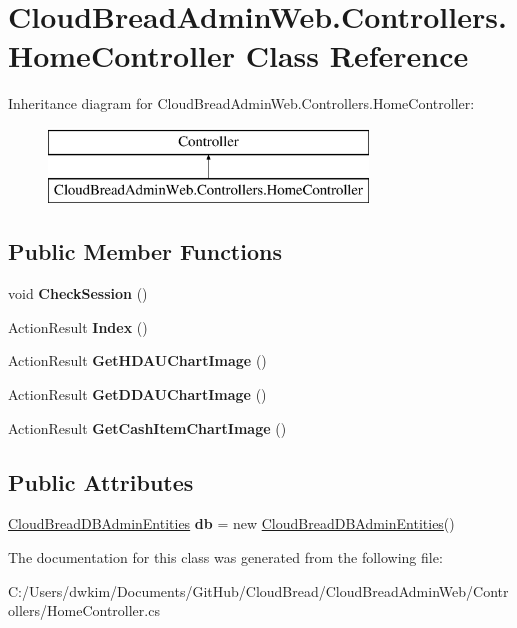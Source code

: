 \hypertarget{a00089}{}\section{Cloud\+Bread\+Admin\+Web.\+Controllers.\+Home\+Controller Class Reference}
\label{a00089}
Inheritance diagram for Cloud\+Bread\+Admin\+Web.\+Controllers.\+Home\+Controller\+:\begin{figure}[H]
\begin{center}
\leavevmode
\includegraphics[height=2.000000cm]{a00089}
\end{center}
\end{figure}
\subsection*{Public Member Functions}
\begin{DoxyCompactItemize}
\item 
void {\bfseries Check\+Session} ()\hypertarget{a00089_a4f9e86bf56470506217c3209adc2e59b}{}\label{a00089_a4f9e86bf56470506217c3209adc2e59b}

\item 
Action\+Result {\bfseries Index} ()\hypertarget{a00089_a69cce42d08d6af4d5ff5f9d46a8c0a60}{}\label{a00089_a69cce42d08d6af4d5ff5f9d46a8c0a60}

\item 
Action\+Result {\bfseries Get\+H\+D\+A\+U\+Chart\+Image} ()\hypertarget{a00089_a829e5f205a637734fd6a77fb4f7bd052}{}\label{a00089_a829e5f205a637734fd6a77fb4f7bd052}

\item 
Action\+Result {\bfseries Get\+D\+D\+A\+U\+Chart\+Image} ()\hypertarget{a00089_a111a81c40ef1fe28dca5eaf5ef0cab1f}{}\label{a00089_a111a81c40ef1fe28dca5eaf5ef0cab1f}

\item 
Action\+Result {\bfseries Get\+Cash\+Item\+Chart\+Image} ()\hypertarget{a00089_ae9f2de6d76e9bdd67b618e0a5dbc34a0}{}\label{a00089_ae9f2de6d76e9bdd67b618e0a5dbc34a0}

\end{DoxyCompactItemize}
\subsection*{Public Attributes}
\begin{DoxyCompactItemize}
\item 
\hyperlink{a00065}{Cloud\+Bread\+D\+B\+Admin\+Entities} {\bfseries db} = new \hyperlink{a00065}{Cloud\+Bread\+D\+B\+Admin\+Entities}()\hypertarget{a00089_a348051ae2729879d2c661d5b2376cdab}{}\label{a00089_a348051ae2729879d2c661d5b2376cdab}

\end{DoxyCompactItemize}


The documentation for this class was generated from the following file\+:\begin{DoxyCompactItemize}
\item 
C\+:/\+Users/dwkim/\+Documents/\+Git\+Hub/\+Cloud\+Bread/\+Cloud\+Bread\+Admin\+Web/\+Controllers/Home\+Controller.\+cs\end{DoxyCompactItemize}
